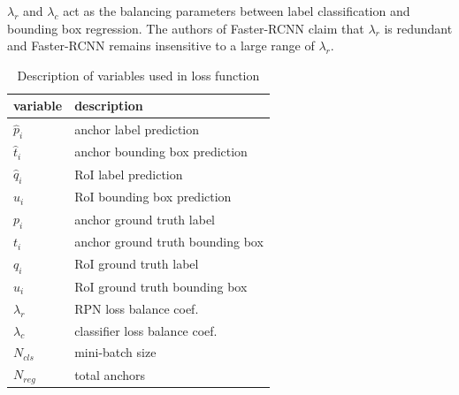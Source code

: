 $\lambda_r$ and $\lambda_c$ act as the balancing parameters between label classification and bounding box regression. The authors of Faster-RCNN claim that $\lambda_r$ is redundant and Faster-RCNN remains insensitive to a large range of $\lambda_r$. 

\begin{table}
    \centering
\caption{Description of variables used in loss function}
\label{table:variable-list}
    \begin{tabular}{| l | l |} \hline
variable & description \\ \hline \hline
$\hat{p}_i$ & anchor label prediction \\ \hline 
$\hat{t}_i$ & anchor bounding box prediction \\ \hline 
$\hat{q}_i$ & RoI label prediction \\ \hline 
$\hat{u}_i$ & RoI bounding box prediction \\ \hline 
${p}_i$ & anchor ground truth label \\ \hline 
${t}_i$ & anchor ground truth bounding box \\ \hline 
${q}_i$ & RoI ground truth label \\ \hline 
${u}_i$ & RoI ground truth bounding box  \\ \hline 
$\lambda_r $ & RPN loss balance coef. \\ \hline 
$\lambda_c $ & classifier loss balance coef.  \\ \hline 
$N_{cls}$ & mini-batch size  \\ \hline 
$N_{reg}$ & total anchors \\ \hline 
    \end{tabular}
\end{table}{}